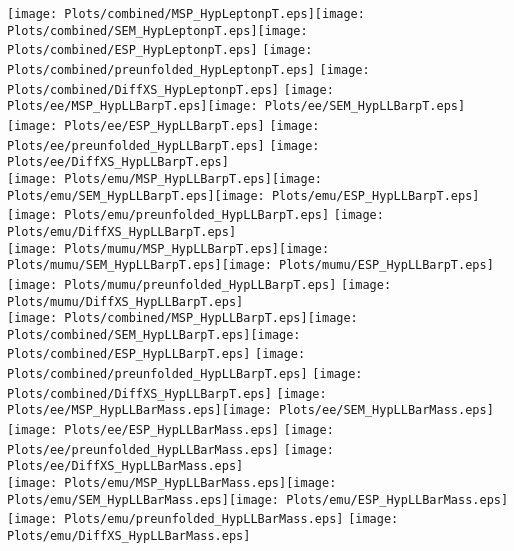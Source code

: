 \documentclass[a4paper,10pt,landscape,pagesize]{scrartcl}
\begin{document}
\texttt{[image: Plots/combined/MSP\_HypLeptonpT.eps]}\texttt{[image: Plots/combined/SEM\_HypLeptonpT.eps]}\texttt{[image: Plots/combined/ESP\_HypLeptonpT.eps]} \texttt{[image: Plots/combined/preunfolded\_HypLeptonpT.eps]} \texttt{[image: Plots/combined/DiffXS\_HypLeptonpT.eps]}
\newpage
\texttt{[image: Plots/ee/MSP\_HypLLBarpT.eps]}\texttt{[image: Plots/ee/SEM\_HypLLBarpT.eps]}\texttt{[image: Plots/ee/ESP\_HypLLBarpT.eps]} \texttt{[image: Plots/ee/preunfolded\_HypLLBarpT.eps]} \texttt{[image: Plots/ee/DiffXS\_HypLLBarpT.eps]}\\
\texttt{[image: Plots/emu/MSP\_HypLLBarpT.eps]}\texttt{[image: Plots/emu/SEM\_HypLLBarpT.eps]}\texttt{[image: Plots/emu/ESP\_HypLLBarpT.eps]} \texttt{[image: Plots/emu/preunfolded\_HypLLBarpT.eps]} \texttt{[image: Plots/emu/DiffXS\_HypLLBarpT.eps]}\\
\texttt{[image: Plots/mumu/MSP\_HypLLBarpT.eps]}\texttt{[image: Plots/mumu/SEM\_HypLLBarpT.eps]}\texttt{[image: Plots/mumu/ESP\_HypLLBarpT.eps]} \texttt{[image: Plots/mumu/preunfolded\_HypLLBarpT.eps]} \texttt{[image: Plots/mumu/DiffXS\_HypLLBarpT.eps]}\\
\texttt{[image: Plots/combined/MSP\_HypLLBarpT.eps]}\texttt{[image: Plots/combined/SEM\_HypLLBarpT.eps]}\texttt{[image: Plots/combined/ESP\_HypLLBarpT.eps]} \texttt{[image: Plots/combined/preunfolded\_HypLLBarpT.eps]} \texttt{[image: Plots/combined/DiffXS\_HypLLBarpT.eps]}
\newpage
\texttt{[image: Plots/ee/MSP\_HypLLBarMass.eps]}\texttt{[image: Plots/ee/SEM\_HypLLBarMass.eps]}\texttt{[image: Plots/ee/ESP\_HypLLBarMass.eps]} \texttt{[image: Plots/ee/preunfolded\_HypLLBarMass.eps]} \texttt{[image: Plots/ee/DiffXS\_HypLLBarMass.eps]}\\
\texttt{[image: Plots/emu/MSP\_HypLLBarMass.eps]}\texttt{[image: Plots/emu/SEM\_HypLLBarMass.eps]}\texttt{[image: Plots/emu/ESP\_HypLLBarMass.eps]} \texttt{[image: Plots/emu/preunfolded\_HypLLBarMass.eps]} \texttt{[image: Plots/emu/DiffXS\_HypLLBarMass.eps]}\\
\end{document}
